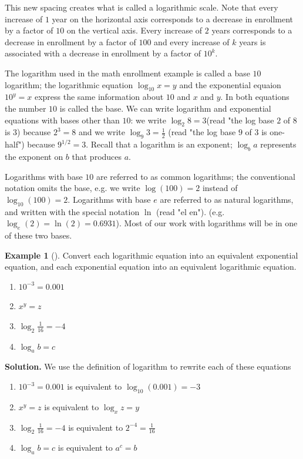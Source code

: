 \documentclass[10pt,]{book}
\theoremstyle{plain}
\theoremstyle{definition}
\theoremstyle{definition}
\newtheorem{example}[theorem]{Example}
\theoremstyle{definition}
\numberwithin{equation}{section}
\begin{document}
\hypertarget{p-281}{}%
This new spacing creates what is called a logarithmic scale. Note that every increase of \(1\) year on the horizontal axis corresponds to a decrease in enrollment by a factor of \(10\) on the vertical axis. Every increase of \(2\) years corresponds to a decrease in enrollment by a factor of \(100\) and every increase of \(k\) years is associated with a decrease in enrollment by a factor of \(10^k\).%
\par
\hypertarget{p-282}{}%
The logarithm used in the math enrollment example is called a base \(10\) logarithm; the logarithmic equation \(\log_{10} x = y\) and the exponential equaion \(10^y = x\) express the same information about \(10\) and \(x\) and \(y\). In both equations the number \(10\) is called the base. We can write logarithm and exponential equations with bases other than \(10\): we write \(\log_2 8 = 3 \)(read "the log base \(2\) of \(8\) is \(3\)) because \(2^3 = 8\) and we write \(\log_9 3= \frac{1}{2}\) (read "the log base \(9\) of \(3\) is one-half") because \(9^{1/2} = 3\). Recall that a logarithm is an exponent; \(\log_b a\) represents the exponent on \(b\) that produces \(a\).%
\par
\hypertarget{p-283}{}%
Logarithms with base \(10\) are referred to as common logarithms; the conventional notation omits the base, e.g. we write \(\log(100) = 2\) instead of \(\log_{10} (100) = 2\). Logarithms with base \(e\) are referred to as natural logarithms, and written with the special notation \(\ln\)  (read "el en"). (e.g. \(\log_e (2) = \ln(2) = 0.6931\)).  Most of our work with logarithms will be in one of these two bases.%
\begin{example}[]\label{example-20}
\hypertarget{p-284}{}%
Convert each logarithmic equation into an equivalent exponential equation, and each exponential equation into an equivalent logarithmic equation.%
\leavevmode%
\begin{enumerate}
\item\hypertarget{li-172}{}\(10^{-3} = 0.001\)%
\item\hypertarget{li-173}{}\(x ^ y = z\)%
\item\hypertarget{li-174}{}\(\log_2 \frac{1}{16} = -4\)%
\item\hypertarget{li-175}{}\(\log_a b = c\)%
\end{enumerate}
\par\smallskip%
\noindent\textbf{Solution.}\hypertarget{solution-20}{}\quad%
\hypertarget{p-285}{}%
We use the definition of logarithm to rewrite each of these equations%
\leavevmode%
\begin{enumerate}
\item\hypertarget{li-176}{}\(10^{-3} = 0.001\) is equivalent to \(\log_{10} (0.001) = -3\)%
\item\hypertarget{li-177}{}\(x ^ y = z\) is equivalent to \(\log_x z = y\)%
\item\hypertarget{li-178}{}\(\log_2 \frac{1}{16} = -4\) is equivalent to \(2 ^ {-4} = \frac{1}{16}\)%
\item\hypertarget{li-179}{}\(\log_a b = c\) is equivalent to \(a ^ c = b\)%
\end{enumerate}
\end{example}
\end{document}
